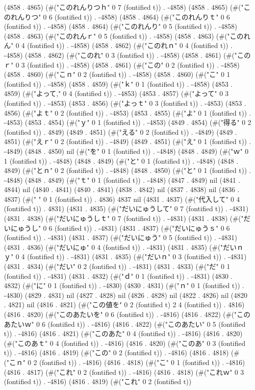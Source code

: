 (4858 . 4865) (#("このれんりつｈ" 0 7 (fontified t)) . -4858) (4858 . 4865) (#("このれんりつ" 0 6 (fontified t)) . -4858) (4858 . 4864) (#("このれんりｔ" 0 6 (fontified t)) . -4858) (4858 . 4864) (#("このれんり" 0 5 (fontified t)) . -4858) (4858 . 4863) (#("このれんｒ" 0 5 (fontified t)) . -4858) (4858 . 4863) (#("このれん" 0 4 (fontified t)) . -4858) (4858 . 4862) (#("このれｎ" 0 4 (fontified t)) . -4858) (4858 . 4862) (#("このれ" 0 3 (fontified t)) . -4858) (4858 . 4861) (#("このｒ" 0 3 (fontified t)) . -4858) (4858 . 4861) (#("この" 0 2 (fontified t)) . -4858) (4858 . 4860) (#("こｎ" 0 2 (fontified t)) . -4858) (4858 . 4860) (#("こ" 0 1 (fontified t)) . -4858) (4858 . 4859) (#("ｋ" 0 1 (fontified t)) . -4858) (4853 . 4859) (#("よって," 0 4 (fontified t)) . -4853) (4853 . 4857) (#("よって" 0 3 (fontified t)) . -4853) (4853 . 4856) (#("よっｔ" 0 3 (fontified t)) . -4853) (4853 . 4856) (#("よｔ" 0 2 (fontified t)) . -4853) (4853 . 4855) (#("よ" 0 1 (fontified t)) . -4853) (4853 . 4854) (#("ｙ" 0 1 (fontified t)) . -4853) (4849 . 4854) (#("得る" 0 2 (fontified t)) . 4849) (4849 . 4851) (#("える" 0 2 (fontified t)) . -4849) (4849 . 4851) (#("えｒ" 0 2 (fontified t)) . -4849) (4849 . 4851) (#("え" 0 1 (fontified t)) . -4849) (4848 . 4850) nil (#("を" 0 1 (fontified t)) . -4848) (4848 . 4849) (#("ｗ" 0 1 (fontified t)) . -4848) (4848 . 4849) (#("と" 0 1 (fontified t)) . -4848) (4848 . 4849) (#("とｎ" 0 2 (fontified t)) . -4848) (4848 . 4850) (#("と" 0 1 (fontified t)) . -4848) (4848 . 4849) (#("ｔ" 0 1 (fontified t)) . -4848) (4847 . 4849) nil (4841 . 4844) nil (4840 . 4841) (4840 . 4841) (4838 . 4842) nil (4837 . 4838) nil (4836 . 4837) (#(" " 0 1 (fontified t)) . 4836) 4837 nil (4831 . 4837) (#("代入して" 0 4 (fontified t)) . 4831) (4831 . 4835) (#("だいにゅうして" 0 7 (fontified t)) . -4831) (4831 . 4838) (#("だいにゅうしｔ" 0 7 (fontified t)) . -4831) (4831 . 4838) (#("だいにゅうし" 0 6 (fontified t)) . -4831) (4831 . 4837) (#("だいにゅうｓ" 0 6 (fontified t)) . -4831) (4831 . 4837) (#("だいにゅう" 0 5 (fontified t)) . -4831) (4831 . 4836) (#("だいにゅ" 0 4 (fontified t)) . -4831) (4831 . 4835) (#("だいｎｙ" 0 4 (fontified t)) . -4831) (4831 . 4835) (#("だいｎ" 0 3 (fontified t)) . -4831) (4831 . 4834) (#("だい" 0 2 (fontified t)) . -4831) (4831 . 4833) (#("だ" 0 1 (fontified t)) . -4831) (4831 . 4832) (#("ｄ" 0 1 (fontified t)) . -4831) (4830 . 4832) (#("に" 0 1 (fontified t)) . -4830) (4830 . 4831) (#("ｎ" 0 1 (fontified t)) . -4830) (4829 . 4831) nil (4827 . 4828) nil (4826 . 4828) nil (4822 . 4826) nil (4820 . 4821) nil (4816 . 4821) (#("この値を" 0 2 (fontified t) 2 4 (fontified t)) . 4816) (4816 . 4820) (#("このあたいを" 0 6 (fontified t)) . -4816) (4816 . 4822) (#("このあたいｗ" 0 6 (fontified t)) . -4816) (4816 . 4822) (#("このあたい" 0 5 (fontified t)) . -4816) (4816 . 4821) (#("このあた" 0 4 (fontified t)) . -4816) (4816 . 4820) (#("このあｔ" 0 4 (fontified t)) . -4816) (4816 . 4820) (#("このあ" 0 3 (fontified t)) . -4816) (4816 . 4819) (#("この" 0 2 (fontified t)) . -4816) (4816 . 4818) (#("こｎ" 0 2 (fontified t)) . -4816) (4816 . 4818) (#("こ" 0 1 (fontified t)) . -4816) (4816 . 4817) (#("これ" 0 2 (fontified t)) . -4816) (4816 . 4818) (#("これｗ" 0 3 (fontified t)) . -4816) (4816 . 4819) (#("これ" 0 2 (fontified t)) 
